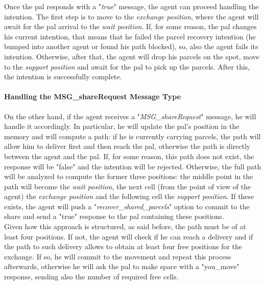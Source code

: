                     Once the pal responds with a "\textit{true}" message, the agent can proceed handling the intention. The first step is to move to the \textit{exchange position}, where the agent will await for the pal arrival to the \textit{wait position}. If, for some reason, the pal changes his current intention, that means that he failed the parcel recovery intention (he bumped into another agent or found his path blocked), so, also the agent fails its intention. Otherwise, after that, the agent will drop his parcels on the spot, move to the \textit{support position} and await for the pal to pick up the parcels. After this, the intention is successfully complete.
                
                \paragraph{Handling the MSG\_shareRequest Message Type}
                    On the other hand, if the agent receives a "\textit{MSG\_shareRequest}" message, he will handle it accordingly. In particular, he will update the pal's position in the memory and will compute a path: if he is currently carrying parcels, the path will allow him to deliver first and then reach the pal, otherwise the path is directly between the agent and the pal. If, for some reason, this path does not exist, the response will be "false" and the intention will be rejected. Otherwise, the full path will be analyzed to compute the former three positions: the middle point in the path will become the \textit{wait position}, the next cell (from the point of view of the agent) the \textit{exchange position} and the following cell the \textit{support position}. If these exists, the agent will push a "\textit{recover\_shared\_parcels}" option to commit to the share and send a "true" response to the pal containing these positions.
                    \medskip\\
                    Given how this approach is structured, as said before, the path must be of at least four positions. If not, the agent will check if he can reach a delivery and if the path to such delivery allows to obtain at least four free positions for the exchange. If so, he will commit to the movement and repeat this process afterwards, otherwise he will ask the pal to make space with a "you\_move" response, sending also the number of required free cells.

